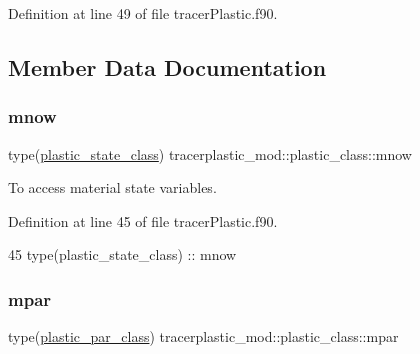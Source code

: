 Definition at line 49 of file tracer\+Plastic.\+f90.



\subsection{Member Data Documentation}
\mbox{\label{structtracerplastic__mod_1_1plastic__class_aa2e33df26e814fa1380e8184c54ee42e}} 
\subsubsection{\texorpdfstring{mnow}{mnow}}
{\footnotesize\ttfamily type(\mbox{\hyperlink{structtracerplastic__mod_1_1plastic__state__class}{plastic\+\_\+state\+\_\+class}}) tracerplastic\+\_\+mod\+::plastic\+\_\+class\+::mnow\hspace{0.3cm}{\ttfamily [private]}}



To access material state variables. 



Definition at line 45 of file tracer\+Plastic.\+f90.


\begin{DoxyCode}
45         \textcolor{keywordtype}{type}(plastic\_state\_class) :: mnow
\end{DoxyCode}
\mbox{\label{structtracerplastic__mod_1_1plastic__class_aa7e8b3a74a085714eac5917aaa2fc8c6}} 
\subsubsection{\texorpdfstring{mpar}{mpar}}
{\footnotesize\ttfamily type(\mbox{\hyperlink{structtracerplastic__mod_1_1plastic__par__class}{plastic\+\_\+par\+\_\+class}}) tracerplastic\+\_\+mod\+::plastic\+\_\+class\+::mpar\hspace{0.3cm}{\ttfamily [private]}}



